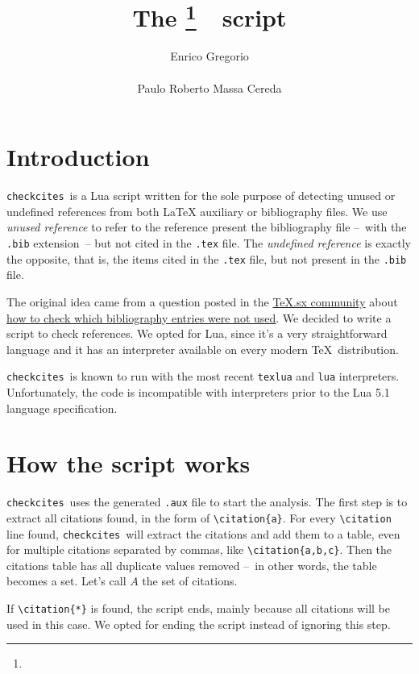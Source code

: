 \documentclass[12pt,a4paper]{article}
\title{The \checkcites\footnote{\version}\ \ script}
\author{%
  Enrico Gregorio\\\email{Enrico dot Gregorio at univr dot it}\\[3ex]
  Paulo Roberto Massa Cereda\\\email{cereda at users dot sf dot net}%
}
\date{}
\newcommand{\checkcites}{\texttt{checkcites}}
\newenvironment{infoblock}[1]
  {\par\addvspace{\medskipamount}
   \begin{tcolorbox}[colframe=DarkTurquoise,coltitle=black,fonttitle=\bfseries,title=#1]}
  {\end{tcolorbox}\addvspace{\medskipamount}}
\begin{document}
\maketitle

\tableofcontents

\section{Introduction}
\label{sec:intro}

\checkcites\ is a Lua script written for the sole purpose of detecting
unused or undefined references from both \LaTeX{} auxiliary or
bibliography files. We use \emph{unused reference} to refer to the
reference present the bibliography file --~with the \verb|.bib|
extension~-- but not cited in the \verb|.tex| file. The
\emph{undefined reference} is exactly the opposite, that is, the items
cited in the \texttt{.tex} file, but not present in the \verb|.bib|
file.

The original idea came from a question posted in the
\href{http://tex.stackexchange.com}{TeX.sx community} about
\href{http://tex.stackexchange.com/questions/43276}{how to check which
bibliography entries were not used}. We decided to write a script to
check references. We opted for Lua, since it's a very straightforward
language and it has an interpreter available on every modern \TeX\
distribution.

\begin{infoblock}{Attention!}
\checkcites\ is known to run with the most recent \verb|texlua| and
\verb|lua| interpreters. Unfortunately, the code is incompatible with
interpreters prior to the Lua 5.1 language specification.
\end{infoblock}

\section{How the script works}
\label{sec:howto}

\checkcites\ uses the generated \verb|.aux| file to start the
analysis. The first step is to extract all citations found, in the
form of \verb|\citation{a}|. For every \verb|\citation| line found,
\checkcites\ will extract the citations and add them to a table, even
for multiple citations separated by commas, like
\verb|\citation{a,b,c}|. Then the citations table has all duplicate
values removed --~in other words, the table becomes a set.  Let's call
$A$ the set of citations.

\begin{infoblock}{Attention!}
If \verb|\citation{*}| is found, the script ends, mainly because all
citations will be used in this case. We opted for ending the script
instead of ignoring this step.
\end{infoblock}
\end{document}
